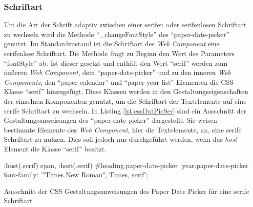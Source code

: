\documentclass[12pt, paper=a4, bibtotoc, toc=listof, headsepline=true, numbers=endperiod]{scrreprt}
\begin{document}
		\subsubsection{Schriftart}
		Um die Art der Schrift adaptiv zwischen einer serifen oder serifenlosen Schriftart zu wechseln wird die Methode \enquote{\_changeFontStyle} des \enquote{paper-date-picker} genutzt. Im Standardzustand ist die Schriftart des \emph{Web Component} eine serifenlose Schriftart. Die Methode fragt zu Beginn den Wert des Parameters \enquote{fontStyle} ab. Ist dieser gesetzt und enthält den Wert \enquote{serif} werden zum äußeren \emph{Web Component}, dem \enquote{paper-date-picker} und zu den inneren \emph{Web Components}, den \enquote{paper-calendar} und \enquote{paper-year-list} Elementen die \ac{CSS} Klasse \enquote{serif} hinzugefügt. Diese Klassen werden in den Gestaltungseigenschaften der einzelnen Komponenten genutzt, um die Schriftart der Textelemente auf eine serife Schriftart zu wechseln. In Listing \ref{lst:cssDatPicSer} sind ein Ausschnitt der Gestaltungsanweisungen des \enquote{paper-date-picker} dargestellt. Sie weisen bestimmte Elemente des \emph{Web Component}, hier die Textelemente, an, eine serife Schriftart zu nutzen. Dies soll jedoch nur durchgeführt werden, wenn das \emph{host} Element die Klasse \enquote{serif} besitzt.
		\begin{listing}
			\begin{CSScode*}{}
:host(.serif) span, :host(.serif) #heading.paper-date-picker .year.paper-date-picker{
   font-family: '"Times New Roman", Times, serif';
}
			\end{CSScode*}
			\caption[CSS des Paper Date Picker für serife Schriftart]{Ausschnitt der CSS Gestaltungsanweisungen des Paper Date Picker für eine serife Schriftart}
			\label{lst:cssDatPicSer}
		\end{listing}
\end{document}
